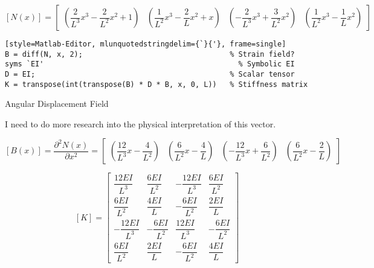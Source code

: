 \documentclass[a4paper]{article}
\begin{document}
\begin{dmath*}
    \left[N(x)\right] =
    \begin{bmatrix}
        \left(
            \dfrac{2}{L^{3}}x^{3} - \dfrac{2}{L^{2}}x^{2} + 1
        \right) &
        \left(
            \dfrac{1}{L^{2}}x^{3} - \dfrac{2}{L}x^{2} + x
        \right) &
        \left(
            -\dfrac{2}{L^{3}}x^{3} + \dfrac{3}{L^{2}}x^{2}
        \right) &
        \left(
            \dfrac{1}{L^{2}}x^{3} - \dfrac{1}{L}x^{2}
        \right)
    \end{bmatrix}
\end{dmath*}





\begin{lstlisting}[style=Matlab-Editor, mlunquotedstringdelim={`}{'}, frame=single]
B = diff(N, x, 2);                                  % Strain field?
syms `EI'                                             % Symbolic EI
D = EI;                                             % Scalar tensor
K = transpose(int(transpose(B) * D * B, x, 0, L))   % Stiffness matrix
\end{lstlisting}

Angular Displacement Field

I need to do more research into the physical interpretation of this vector.

\begin{dmath*}
    \left[B(x)\right] = \dfrac{\partial^{2} N(x)}{\partial x^{2}} = 
    \begin{bmatrix}
        \left(
            \dfrac{12}{L^{3}}x - \dfrac{4}{L^{2}}
        \right) &
        \left(
            \dfrac{6}{L^{2}}x - \dfrac{4}{L}
        \right) &
        \left(
            -\dfrac{12}{L^{3}}x + \dfrac{6}{L^{2}}
        \right) &
        \left(
            \dfrac{6}{L^{2}}x - \dfrac{2}{L}
        \right)
    \end{bmatrix}
\end{dmath*}

\begin{dmath*}
    \left[K\right] =
    \begin{bmatrix}
        \dfrac{12EI}{L^{3}} & \dfrac{6EI}{L^{2}} & -\dfrac{12EI}{L^{3}} & \dfrac{6EI}{L^{2}} \\[1em]
        \dfrac{6EI}{L^{2}} & \dfrac{4EI}{L} & -\dfrac{6EI}{L^{2}} & \dfrac{2EI}{L} \\[1em]
        -\dfrac{12EI}{L^{3}} & -\dfrac{6EI}{L^{2}} & \dfrac{12EI}{L^{3}} & -\dfrac{6EI}{L^{2}} \\[1em]
        \dfrac{6EI}{L^{2}} & \dfrac{2EI}{L} & -\dfrac{6EI}{L^{2}} & \dfrac{4EI}{L}
    \end{bmatrix}
\end{dmath*}
\end{document}
